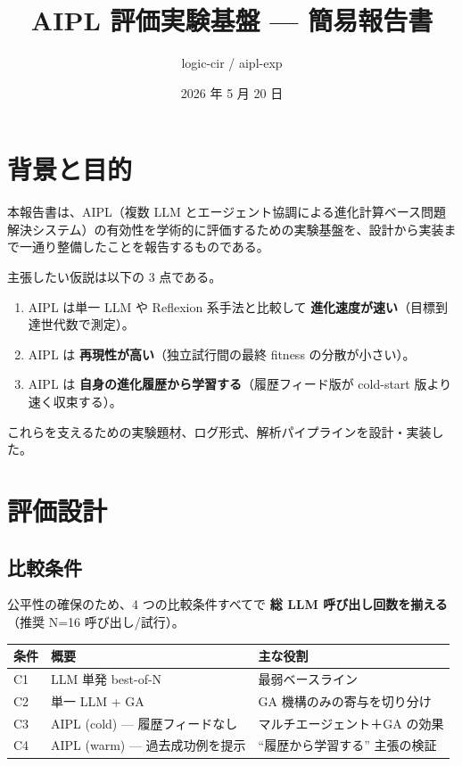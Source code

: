 \documentclass[a4paper,11pt]{ltjsarticle}
\title{AIPL 評価実験基盤 — 簡易報告書}
\author{logic-cir / aipl-exp}
\date{2026 年 5 月 20 日}
\begin{document}
\maketitle

\section{背景と目的}

本報告書は、AIPL（複数 LLM とエージェント協調による進化計算ベース問題解決システム）の有効性を学術的に評価するための実験基盤を、設計から実装まで一通り整備したことを報告するものである。

主張したい仮説は以下の 3 点である。
\begin{enumerate}[leftmargin=2em,itemsep=2pt]
  \item AIPL は単一 LLM や Reflexion 系手法と比較して \textbf{進化速度が速い}（目標到達世代数で測定）。
  \item AIPL は \textbf{再現性が高い}（独立試行間の最終 fitness の分散が小さい）。
  \item AIPL は \textbf{自身の進化履歴から学習する}（履歴フィード版が cold-start 版より速く収束する）。
\end{enumerate}

これらを支えるための実験題材、ログ形式、解析パイプラインを設計・実装した。

\section{評価設計}

\subsection{比較条件}

公平性の確保のため、4 つの比較条件すべてで \textbf{総 LLM 呼び出し回数を揃える}（推奨 N=16 呼び出し/試行）。

\begin{center}
\begin{tabular}{@{}lll@{}}
\toprule
条件 & 概要 & 主な役割 \\
\midrule
C1 & LLM 単発 best-of-N           & 最弱ベースライン \\
C2 & 単一 LLM + GA                & GA 機構のみの寄与を切り分け \\
C3 & AIPL (cold) — 履歴フィードなし & マルチエージェント＋GA の効果 \\
C4 & AIPL (warm) — 過去成功例を提示  & ``履歴から学習する'' 主張の検証 \\
\bottomrule
\end{tabular}
\end{center}
\end{document}
